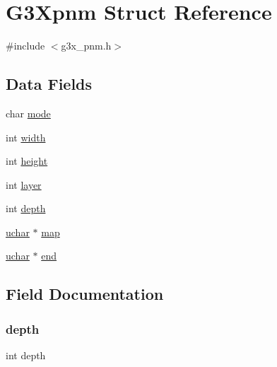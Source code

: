 \hypertarget{struct_g3_xpnm}{}\section{G3\+Xpnm Struct Reference}
\label{struct_g3_xpnm}


{\ttfamily \#include $<$g3x\+\_\+pnm.\+h$>$}

\subsection*{Data Fields}
\begin{DoxyCompactItemize}
\item 
char \hyperlink{struct_g3_xpnm_a000e34997df38c2005a83d63e67d9282}{mode}
\item 
int \hyperlink{struct_g3_xpnm_a2474a5474cbff19523a51eb1de01cda4}{width}
\item 
int \hyperlink{struct_g3_xpnm_ad12fc34ce789bce6c8a05d8a17138534}{height}
\item 
int \hyperlink{struct_g3_xpnm_af5e6403cb6864751421a5e7249e4cc62}{layer}
\item 
int \hyperlink{struct_g3_xpnm_acb5ba97551079e0b072c62c21d784ac5}{depth}
\item 
\hyperlink{g3x__types_8h_a65f85814a8290f9797005d3b28e7e5fc}{uchar} $\ast$ \hyperlink{struct_g3_xpnm_a000e8e2f53a1c0edd509f9a125c24d09}{map}
\item 
\hyperlink{g3x__types_8h_a65f85814a8290f9797005d3b28e7e5fc}{uchar} $\ast$ \hyperlink{struct_g3_xpnm_a213099dd72c580e63fc2c3113b8a1368}{end}
\end{DoxyCompactItemize}


\subsection{Field Documentation}
\mbox{\label{struct_g3_xpnm_acb5ba97551079e0b072c62c21d784ac5}} 
\subsubsection{\texorpdfstring{depth}{depth}}
{\footnotesize\ttfamily int depth}

\mbox{\label{struct_g3_xpnm_a213099dd72c580e63fc2c3113b8a1368}} 
